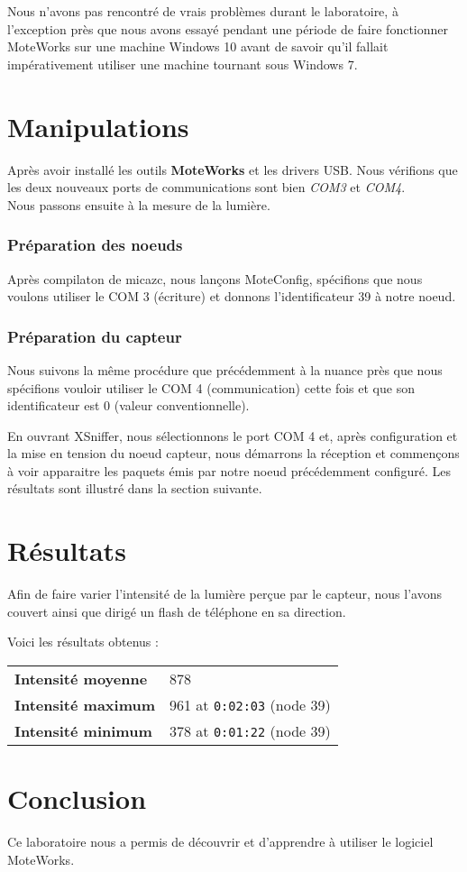 Nous n'avons pas rencontré de vrais problèmes durant le laboratoire, à l'exception près que nous avons essayé pendant une période de faire fonctionner MoteWorks sur une machine Windows 10 avant de savoir qu'il fallait impérativement utiliser une machine tournant sous Windows 7.

\section*{Manipulations}
Après avoir installé les outils \textbf{MoteWorks} et les drivers USB. Nous vérifions que les deux nouveaux ports de communications sont bien \textit{COM3} et \textit{COM4}. \\

Nous passons ensuite à la mesure de la lumière.

\subsubsection*{Préparation des noeuds}
Après compilaton de micazc, nous lançons MoteConfig, spécifions que nous voulons utiliser le COM 3 (écriture) et donnons l'identificateur 39 à notre noeud.

\subsubsection{Préparation du capteur}
Nous suivons la même procédure que précédemment à la nuance près que nous spécifions vouloir utiliser le COM 4 (communication) cette fois et que son identificateur est 0 (valeur conventionnelle).

En ouvrant XSniffer, nous sélectionnons le port COM 4 et, après configuration et la mise en tension du noeud capteur, nous démarrons la réception et commençons à voir apparaitre les paquets émis par notre noeud précédemment configuré. Les résultats sont illustré dans la section suivante.

\section*{Résultats}

Afin de faire varier l'intensité de la lumière perçue par le capteur, nous l'avons couvert ainsi que dirigé un flash de téléphone en sa direction.

Voici les résultats obtenus :

\begin{center}

\begin{tabular}{ll}
	\hline
	\textbf{Intensité moyenne} & 878 \\
	\textbf{Intensité maximum} & 961 at \texttt{0:02:03} (node 39) \\
	\textbf{Intensité minimum} & 378 at \texttt{0:01:22} (node 39) \\
	\hline
\end{tabular}

\end{center}

\section*{Conclusion}

Ce laboratoire nous a permis de découvrir et d'apprendre à utiliser le logiciel MoteWorks.

